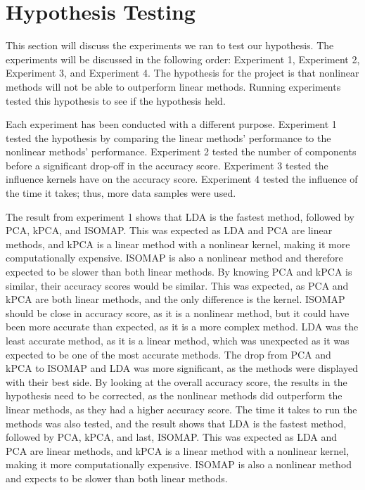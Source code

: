 \section{Hypothesis Testing} \label{sec:experiments}
This section will discuss the experiments we ran to test our hypothesis. The experiments will be discussed in the following order: Experiment 1, Experiment 2, Experiment 3, and Experiment 4. The hypothesis for the project is that nonlinear methods will not be able to outperform linear methods. Running experiments tested this hypothesis to see if the hypothesis held. 

Each experiment has been conducted with a different purpose. Experiment 1 tested the hypothesis by comparing the linear methods' performance to the nonlinear methods' performance. Experiment 2 tested the number of components before a significant drop-off in the accuracy score. Experiment 3 tested the influence kernels have on the accuracy score. Experiment 4 tested the influence of the time it takes; thus, more data samples were used.

The result from experiment 1 shows that LDA is the fastest method, followed by PCA, kPCA, and ISOMAP. This was expected as LDA and PCA are linear methods, and kPCA is a linear method with a nonlinear kernel, making it more computationally expensive. ISOMAP is also a nonlinear method and therefore expected to be slower than both linear methods. By knowing PCA and kPCA is similar, their accuracy scores would be similar. This was expected, as PCA and kPCA are both linear methods, and the only difference is the kernel. ISOMAP should be close in accuracy score, as it is a nonlinear method, but it could have been more accurate than expected, as it is a more complex method. LDA was the least accurate method, as it is a linear method, which was unexpected as it was expected to be one of the most accurate methods. The drop from PCA and kPCA to ISOMAP and LDA was more significant, as the methods were displayed with their best side. By looking at the overall accuracy score, the results in the hypothesis need to be corrected, as the nonlinear methods did outperform the linear methods, as they had a higher accuracy score. The time it takes to run the methods was also tested, and the result shows that LDA is the fastest method, followed by PCA, kPCA, and last, ISOMAP. This was expected as LDA and PCA are linear methods, and kPCA is a linear method with a nonlinear kernel, making it more computationally expensive. ISOMAP is also a nonlinear method and expects to be slower than both linear methods.



